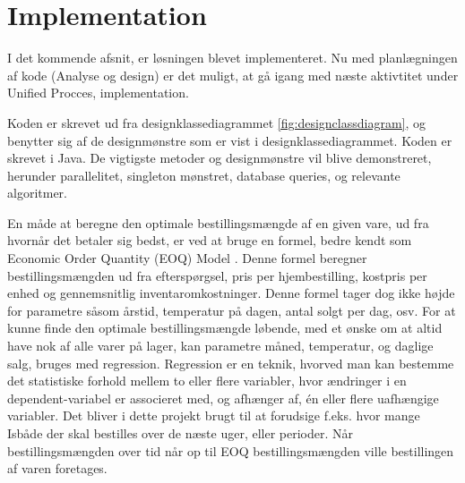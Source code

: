 \chapter{Implementation}\label{ch:implementation}
I det kommende afsnit, er løsningen blevet implementeret. Nu med planlægningen af kode (Analyse og design) er det muligt, at gå igang med næste aktivtitet under Unified Procces, implementation\cite{UnifiedProcess}. 

Koden er skrevet ud fra designklassediagrammet \ref{fig:designclassdiagram}, og benytter sig af de designmønstre som er vist i designklassediagrammet. Koden er skrevet i Java. 
De vigtigste metoder og designmønstre vil blive demonstreret, herunder parallelitet, singleton mønstret, database queries, og relevante algoritmer.



En måde at beregne den optimale bestillingsmængde af en given vare, ud fra hvornår det betaler sig bedst, er ved at bruge en formel, bedre kendt som Economic Order Quantity (EOQ) Model \cite{EOQ}. Denne formel beregner bestillingsmængden ud fra efterspørgsel, pris per hjembestilling, kostpris per enhed og gennemsnitlig inventaromkostninger. Denne formel tager dog ikke højde for parametre såsom årstid, temperatur på dagen, antal solgt per dag, osv. For at kunne finde den optimale bestillingsmængde løbende, med et ønske om at altid have nok af alle varer på lager, kan parametre måned, temperatur, og daglige salg, bruges med regression. Regression er en teknik, hvorved man kan bestemme det statistiske forhold mellem to eller flere variabler, hvor ændringer i en dependent-variabel er associeret med, og afhænger af, én eller flere uafhængige variabler. Det bliver i dette projekt brugt til at forudsige f.eks. hvor mange Isbåde\cite{Isbåd} der skal bestilles over de næste uger, eller perioder. Når bestillingsmængden over tid når op til EOQ bestillingsmængden ville bestillingen af varen foretages.


